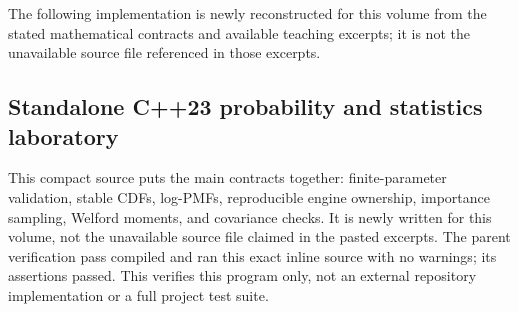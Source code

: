 The following implementation is newly reconstructed for this volume from the stated mathematical contracts and available teaching excerpts; it is not the unavailable source file referenced in those excerpts.

\subsection{Standalone C++23 probability and statistics laboratory}\label{02-foundations-ii-ch038-standalone-c23-probability-and-statistics-laboratory}

This compact source puts the main contracts together: finite-parameter validation, stable CDFs, log-PMFs, reproducible engine ownership, importance sampling, Welford moments, and covariance checks. It is newly written for this volume, not the unavailable source file claimed in the pasted excerpts. The parent verification pass compiled and ran this exact inline source with no warnings; its assertions passed. This verifies this program only, not an external repository implementation or a full project test suite.

